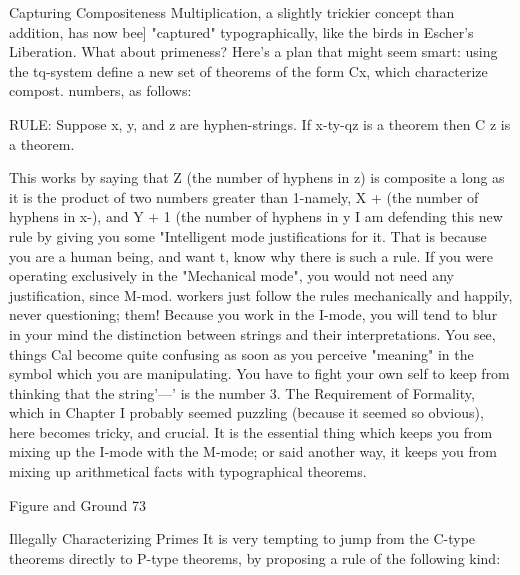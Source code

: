                              Capturing Compositeness
Multiplication, a slightly trickier concept than addition, has now bee] "captured"
typographically, like the birds in Escher's Liberation. What about primeness? Here's a
plan that might seem smart: using the tq-system define a new set of theorems of the form
Cx, which characterize compost. numbers, as follows:

RULE: Suppose x, y, and z are hyphen-strings. If x-ty-qz is a theorem then C z is a
theorem.

This works by saying that Z (the number of hyphens in z) is composite a long as it is the
product of two numbers greater than 1-namely, X + (the number of hyphens in x-), and Y
+ 1 (the number of hyphens in y I am defending this new rule by giving you some
"Intelligent mode justifications for it. That is because you are a human being, and want t,
know why there is such a rule. If you were operating exclusively in the "Mechanical
mode", you would not need any justification, since M-mod. workers just follow the rules
mechanically and happily, never questioning; them!
        Because you work in the I-mode, you will tend to blur in your mind the
distinction between strings and their interpretations. You see, things Cal become quite
confusing as soon as you perceive "meaning" in the symbol which you are manipulating.
You have to fight your own self to keep from thinking that the string'---' is the number 3.
The Requirement of Formality, which in Chapter I probably seemed puzzling (because it
seemed so obvious), here becomes tricky, and crucial. It is the essential thing which
keeps you from mixing up the I-mode with the M-mode; or said another way, it keeps
you from mixing up arithmetical facts with typographical theorems.




Figure and Ground                                                                          73

                          Illegally Characterizing Primes
It is very tempting to jump from the C-type theorems directly to P-type theorems, by
proposing a rule of the following kind:


